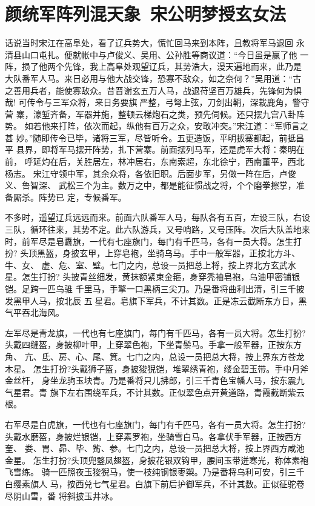 \chapter{颜统军阵列混天象~宋公明梦授玄女法}

话说当时宋江在高阜处，看了辽兵势大，慌忙回马来到本阵，且教将军马退回
永清县山口屯扎。便就帐中与卢俊义、吴用、公孙胜等商议道：“今日虽是赢了他
一阵，损了他两个先锋，我上高阜处观望辽兵，其势浩大，漫天遍地而来，此乃是
大队番军人马。来日必用与他大战交锋，恐寡不敌众，如之奈何？”吴用道：“古
之善用兵者，能使寡敌众。昔晋谢玄五万人马，战退苻坚百万雄兵，先锋何为惧哉!
可传令与三军众将，来日务要旗严整，弓弩上弦，刀剑出鞘，深栽鹿角，警守营
寨，濠堑齐备，军器并施，整顿云梯炮石之类，预先伺候。还只摆九宫八卦阵势。
如若他来打阵，依次而起，纵他有百万之众，安敢冲突。”宋江道：“军师言之甚
妙。”随即传令已毕，诸将三军，尽皆听令。五更造饭，平明拔寨都起，前抵昌平
县界，即将军马摆开阵势，扎下营寨。前面摆列马军，还是虎军大将：秦明在前，
呼延灼在后，关胜居左，林冲居右，东南索超，东北徐宁，西南董平，西北杨志。
宋江守领中军，其余众将，各依旧职。后面步军，另做一阵在后，卢俊义、鲁智深、
武松三个为主。数万之中，都是能征惯战之将，个个磨拳擦掌，准备厮杀。阵势已
定，专候番军。

不多时，遥望辽兵远远而来。前面六队番军人马，每队各有五百，左设三队，右设
三队，循环往来，其势不定。此六队游兵，又号哨路，又号压阵。次后大队盖地来
时，前军尽是皂纛旗，一代有七座旗门，每门有千匹马，各有一员大将。怎生打扮?
头顶黑盔，身披玄甲，上穿皂袍，坐骑乌马。手中一般军器，正按北方斗、牛、女、
虚、危、室、壁。七门之内，总设一员把总上将，按上界北方玄武水星。怎生打扮?
头披青丝细发，黄抹额紧束金箍，身穿秃袖皂袍，乌油甲密铺银铠。足跨一匹乌骓
千里马，手擎一口黑柄三尖刀。乃是番将曲利出清，引三千披发黑甲人马，按北辰
五星君。皂旗下军兵，不计其数。正是冻云截断东方日，黑气平吞北海风。

左军尽是青龙旗，一代也有七座旗门，每门有千匹马，各有一员大将。怎生打扮?
头戴四缝盔，身披柳叶甲，上穿翠色袍，下坐青鬃马。手拿一般军器，正按东方角、
亢、氐、房、心、尾、箕。七门之内，总设一员把总大将，按上界东方苍龙木星。
怎生打扮?头戴狮子盔，身披狻猊铠，堆翠绣青袍，缕金碧玉带。手中月斧金丝杆，
身坐龙驹玉块青。乃是番将只儿拂郎，引三千青色宝幡人马，按东震九气星君。青
旗下左右围绕军兵，不计其数。正似翠色点开黄道路，青霞截断紫云根。

右军尽是白虎旗，一代也有七座旗门，每门有千匹马，各有一员大将。怎生打扮?
头戴水磨盔，身披烂银铠，上穿素罗袍，坐骑雪白马。各拿伏手军器，正按西方奎、
娄、胃、昴、毕、觜、参。七门之内，总设一员把总大将，按上界西方咸池金星。
怎生打扮?头顶兜鍪凤翅盔，身披花银双钩甲，腰间玉带迸寒光，称体素袍飞雪练。
骑一匹照夜玉狻猊马，使一枝纯钢银枣槊。乃是番将乌利可安，引三千白缨素旗人
马，按西兑七气星君。白旗下前后护御军兵，不计其数。正似征驼卷尽阴山雪，番
将斜披玉井冰。


